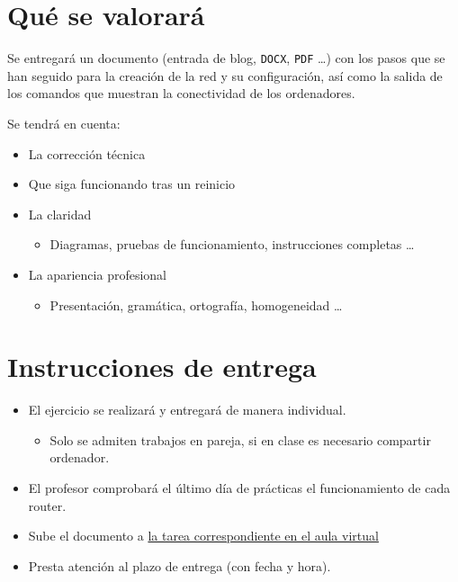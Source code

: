 \documentclass[a4paper]{article}
\begin{document}
\section{Qué se valorará}
\label{sec:org000000f}
Se entregará un documento (entrada de blog, \texttt{DOCX}, \texttt{PDF} \ldots) con los pasos que se han seguido para la creación de la red y su configuración, así como la salida de los comandos que muestran la conectividad de los ordenadores.

Se tendrá en cuenta:
\begin{itemize}
\item La corrección técnica
\item Que siga funcionando tras un reinicio
\item La claridad
\begin{itemize}
\item Diagramas, pruebas de funcionamiento, instrucciones completas \ldots
\end{itemize}
\item La apariencia profesional
\begin{itemize}
\item Presentación, gramática, ortografía, homogeneidad \ldots
\end{itemize}
\end{itemize}



\section{Instrucciones de entrega}
\label{sec:org0000012}
\begin{itemize}
\item El ejercicio se realizará y entregará de manera individual.
\begin{itemize}
\item Solo se admiten trabajos en pareja, si en clase es necesario compartir ordenador.
\end{itemize}
\item El profesor comprobará el último día de prácticas el funcionamiento de cada router.
\item Sube el documento a \href{https://aulavirtual3.educa.madrid.org/ies.alonsodeavellan.alcala/course/view.php?id=189}{la tarea correspondiente en el aula virtual}
\item Presta atención al plazo de entrega (con fecha y hora).
\end{itemize}
\end{document}
